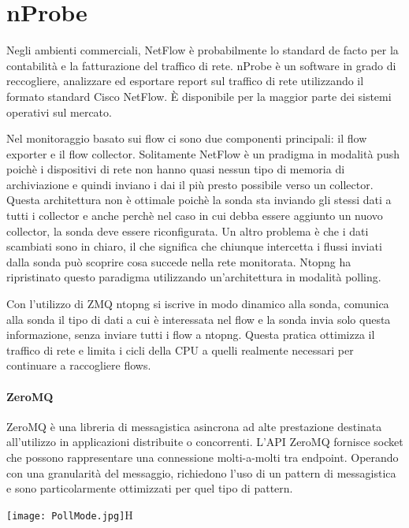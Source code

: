 \documentclass[../main.tex]{subfiles}
\begin{document}
\section{nProbe}

Negli ambienti commerciali, NetFlow è probabilmente lo standard de facto per la contabilità e la fatturazione del traffico di rete. nProbe è un software in grado di reccogliere, analizzare ed esportare report sul traffico di rete utilizzando il formato standard Cisco NetFlow. È disponibile per la maggior parte dei sistemi operativi sul mercato. \newline

Nel monitoraggio basato sui flow ci sono due componenti principali: il flow exporter e il flow collector. Solitamente NetFlow è un pradigma in modalità push poichè i dispositivi di rete non hanno quasi nessun tipo di memoria di archiviazione e quindi inviano i dai il più presto possibile verso un collector. Questa architettura non è ottimale poichè la sonda sta inviando gli stessi dati a tutti i collector e anche perchè nel caso in cui debba essere aggiunto un nuovo collector, la sonda deve essere riconfigurata. Un altro problema è che i dati scambiati sono in chiaro, il che significa che chiunque intercetta i flussi inviati dalla sonda può scoprire cosa succede nella rete monitorata. 
Ntopng ha ripristinato questo paradigma utilizzando un'architettura in modalità polling. \newline

Con l'utilizzo di ZMQ ntopng si iscrive in modo dinamico alla sonda, comunica alla sonda il tipo di dati a cui è interessata nel flow e la sonda invia solo questa informazione, senza inviare tutti i flow a ntopng. Questa pratica ottimizza il traffico di rete e limita i cicli della CPU a quelli realmente necessari per continuare a raccogliere flows.

\paragraph{ZeroMQ}
ZeroMQ è una libreria di messagistica asincrona ad alte prestazione destinata all'utilizzo in applicazioni distribuite o concorrenti. L'API ZeroMQ fornisce socket che possono rappresentare una connessione molti-a-molti tra endpoint. Operando con una granularità del messaggio, richiedono l'uso di un pattern di messagistica e sono particolarmente ottimizzati per quel tipo di pattern.


\texttt{[image: PollMode.jpg]}{H}
\end{document}
